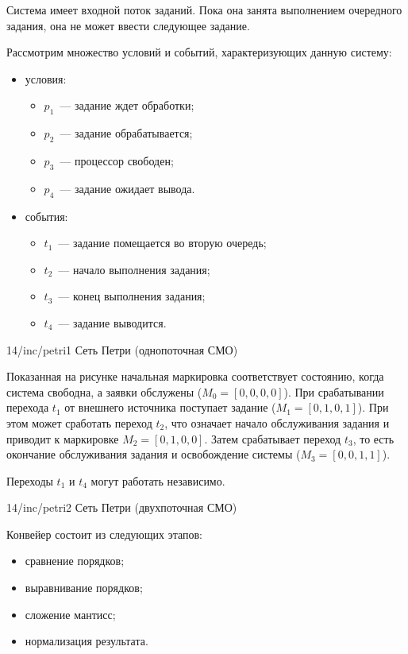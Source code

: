 Система имеет входной поток заданий. Пока она занята выполнением очередного задания, она не может ввести следующее задание.

Рассмотрим множество условий и событий, характеризующих данную систему:

\begin{itemize}
    \item условия:
          \begin{itemize}
              \item $p_1$~--- задание ждет обработки;
              \item $p_2$~--- задание обрабатывается;
              \item $p_3$~--- процессор свободен;
              \item $p_4$~--- задание ожидает вывода.
          \end{itemize}
    \item события:
          \begin{itemize}
              \item $t_1$~--- задание помещается во вторую очередь;
              \item $t_2$~--- начало выполнения задания;
              \item $t_3$~--- конец выполнения задания;
              \item $t_4$~--- задание выводится.
          \end{itemize}
\end{itemize}

\image
{\textwidth}
{14/inc/petri1}
{Сеть Петри (однопоточная СМО)}

Показанная на рисунке начальная маркировка соответствует состоянию, когда система свободна, а заявки обслужены (${M_0=[0,0,0,0]}$). При срабатывании перехода $t_1$ от внешнего источника поступает задание (${M_1=[0,1,0,1]}$). При этом может сработать переход $t_2$, что означает начало обслуживания задания и приводит к маркировке ${M_2=[0,1,0,0]}$. Затем срабатывает переход $t_3$, то есть окончание обслуживания задания и освобождение системы (${M_3=[0,0,1,1]}$).

Переходы $t_1$ и $t_4$ могут работать независимо.

\image
{\textwidth}
{14/inc/petri2}
{Сеть Петри (двухпоточная СМО)}

Конвейер состоит из следующих этапов:

\begin{itemize}
    \item сравнение порядков;
    \item выравнивание порядков;
    \item сложение мантисс;
    \item нормализация результата.
\end{itemize}

